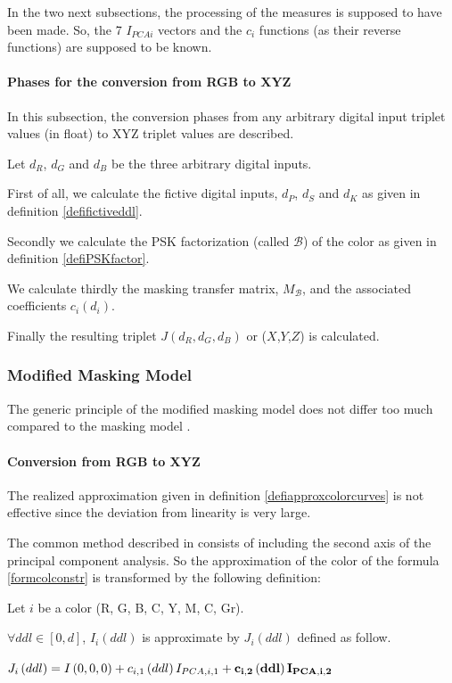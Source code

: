 In the two next subsections, the processing of the measures is supposed to have been made. 
So, the 7 $I_{PCAi}$ vectors and the $c_{i}$ functions (as their reverse functions) are supposed to be known.

\paragraph{Phases for the conversion from RGB to XYZ}
In this subsection, the conversion phases from any arbitrary digital input triplet values (in float) to XYZ triplet values are described.\par
Let $d_{R}$, $d_{G}$ and $d_{B}$ be the three arbitrary digital inputs.\par
First of all, we calculate the fictive digital inputs, $d_{P}$, $d_{S}$ and $d_{K}$ as given in definition \ref{defifictiveddl}.\par
Secondly we calculate the PSK factorization (called $\mathscr{B}$) of the color as given in definition \ref{defiPSKfactor}.\par
We calculate thirdly the masking transfer matrix, $M_{\mathscr{B}}$, and the associated coefficients $c_{i}\left(d_{i}\right)$.\par
Finally the resulting triplet $J\left(d_{R},d_{G},d_{B}\right)$ or ($X$,$Y$,$Z$) is calculated.\par


\subsubsection{Modified Masking Model}

The generic principle of the modified masking model does not differ too much compared to the masking model \cite{Tam02}. 

\paragraph{Conversion from RGB to XYZ}

The realized approximation given in definition \ref{defiapproxcolorcurves} is not effective since the deviation from linearity is very large. 

The common method described in \cite{Tam02} consists of including the second axis of the principal component analysis.
So the approximation of the color of the formula \ref{formcolconstr} is transformed by the following definition:

\begin{defi}
Let $i$ be a color (R, G, B, C, Y, M, C, Gr).\par
$\forall ddl\in\left[0,d\right]$, $I_{i}\left(ddl\right)$ is approximate by $J_{i}\left(ddl\right)$ defined as follow.\\
\begin{center}
$J_{i}\left(ddl\right)=I\left(0,0,0\right)+c_{i,1}\left(ddl\right)I_{PCA,i,1}+{\bf c_{i,2}\left(ddl\right)I_{PCA,i,2}}$\par
\end{center}
\end{defi}

